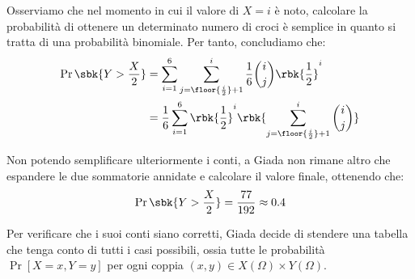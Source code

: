\documentclass[a4paper, 12pt]{report}
\begin{document}
    Osserviamo che nel momento in cui il valore di $X = i$ è noto, calcolare la probabilità di ottenere un determinato numero di croci è semplice in quanto si tratta di una probabilità binomiale. Per tanto, concludiamo che:
    \[\begin{split}
        \Pr\sbk{Y > \frac{X}{2}} &= \sum_{i = 1}^{6} \sum_{j = \floor{\frac{i}{2}}+1}^i \frac{1}{6} \binom{i}{j} \rbk{\frac{1}{2}}^i \\
        &= \frac{1}{6} \sum_{i = 1}^{6} \rbk{\frac{1}{2}}^i \rbk{\sum_{j = \floor{\frac{i}{2}}+1}^i \binom{i}{j}} \\
    \end{split}\]

    Non potendo semplificare ulteriormente i conti, a Giada non rimane altro che espandere le due sommatorie annidate e calcolare il valore finale, ottenendo che:
    \[\Pr\sbk{Y > \frac{X}{2}} = \frac{77}{192} \approx 0.4\]

    Per verificare che i suoi conti siano corretti, Giada decide di stendere una tabella che tenga conto di tutti i casi possibili, ossia tutte le probabilità $\Pr[X = x, Y = y]$ per ogni coppia $(x,y) \in X(\Omega) \times Y(\Omega)$.
\end{document}
